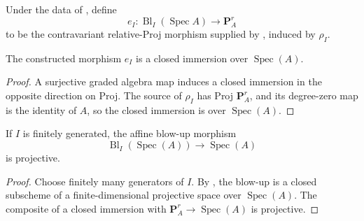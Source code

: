 \begin{definition}
  \label{def:nagata-affine-blowup-projective-embedding}

  Under the data of , define
  \[
    e_I\colon\operatorname{Bl}_I(\operatorname{Spec}A)
      \longrightarrow\mathbf P^r_A
  \]
  to be the contravariant relative-Proj morphism supplied by
  , induced by $\rho_I$.
\end{definition}

\begin{lemma}
  \label{lemma:nagata-affine-blowup-projective-embedding}

  The constructed morphism $e_I$ is a closed immersion over
  $\operatorname{Spec}(A)$.
\end{lemma}

\begin{proof}
  A surjective graded algebra map induces a closed immersion in the opposite
  direction on Proj.  The source of $\rho_I$ has Proj $\mathbf P^r_A$, and
  its degree-zero map is the identity of $A$, so the closed immersion is over
  $\operatorname{Spec}(A)$.
\end{proof}


\begin{proposition}
  \label{prop:nagata-affine-blowup-projective}

  If \(I\) is finitely generated, the affine blow-up morphism
  \[
    \operatorname{Bl}_I(\operatorname{Spec}(A))
      \longrightarrow\operatorname{Spec}(A)
  \]
  is projective.
\end{proposition}

\begin{proof}
  Choose finitely many generators of \(I\).  By
  , the blow-up is a
  closed subscheme of a finite-dimensional projective space over
  \(\operatorname{Spec}(A)\).  The composite of a closed immersion with
  \(\mathbf P^r_A\to\operatorname{Spec}(A)\) is projective.
\end{proof}

